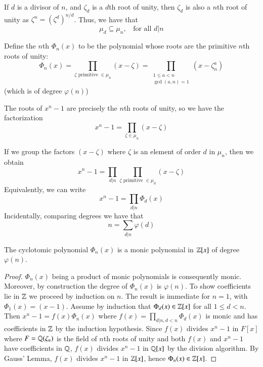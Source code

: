 \documentclass[12pt, a4paper, oneside, openright, titlepage]{book}
\begin{document}
If $d$ is a divisor of $n$, and $\zeta_d$ is a $d$th root of unity, then $\zeta_d$ is also a $n$th root of unity as $\zeta^n = (\zeta^d)^{n/d}$. Thus, we have that \begin{equation*}
    \mu_d \subseteq \mu_n, \;\;\text{ for all } d\vert n
\end{equation*}

\begin{defn}
    Define the $n$th  $\Phi_n(x)$ to be the polynomial whose roots are the primitive $n$th roots of unity: \begin{equation*}
        \Phi_n(x) = \prod_{\zeta \text{ primitive } \in \mu_n}(x-\zeta) = \prod_{\begin{array}{cc} 1\leq a < n \\ \gcd(a,n)=1\end{array}}(x-\zeta_n^a)
    \end{equation*}
    (which is of degree $\varphi(n)$)
\end{defn}

The roots of $x^n - 1$ are precisely the $n$th roots of unity, so we have the factorization \begin{equation*}
    x^n - 1 = \prod_{\zeta \in \mu_n}(x-\zeta)
\end{equation*}

If we group the factors $(x-\zeta)$ where $\zeta$ is an element of order $d$ in $\mu_n$, then we obtain \begin{equation*}
    x^n - 1 = \prod_{d\vert n}\prod_{\zeta \text{ primitive } \in \mu_d}(x-\zeta)
\end{equation*}
Equivalently, we can write \begin{equation*}
    x^n - 1 = \prod_{d\vert n}\Phi_d(x)
\end{equation*}
Incidentally, comparing degrees we have that \begin{equation*}
    n = \sum_{d\vert n}\varphi(d)
\end{equation*}


\begin{lem}
    The cyclotomic polynomial $\Phi_n(x)$ is a monic polynomial in $\mathbb Z[x]$ of degree $\varphi(n)$.
\end{lem}
\begin{proof}
    $\Phi_n(x)$ being a product of monic polynomials is consequently monic. Moreover, by construction the degree of $\Phi_n(x)$ is $\varphi(n)$. To show coefficients lie in $\mathbb Z$ we proceed by induction on $n$. The result is immediate for $n = 1$, with $\Phi_1(x) = (x-1)$. Assume by induction that $\Phi_d(x) \in \mathbb Z[x]$ for all $1 \leq d < n$. Then $x^n - 1 = f(x)\Phi_n(x)$ where $f(x) = \prod_{d\vert n,d <n}\Phi_d(x)$ is monic and has coefficients in $\mathbb Z$ by the induction hypothesis. Since $f(x)$ divides $x^n -1$ in $F[x]$ where $F = \mathbb Q(\zeta_n)$ is the field of $n$th roots of unity and both $f(x)$ and $x^n-1$ have coefficients in $\mathbb Q$, $f(x)$ divides $x^n-1$ in $\mathbb Q[x]$ by the division algorithm. By Gauss' Lemma, $f(x)$ divides $x^n-1$ in $\mathbb Z[x]$, hence $\Phi_n(x) \in \mathbb Z[x]$.
\end{proof}
\end{document}
